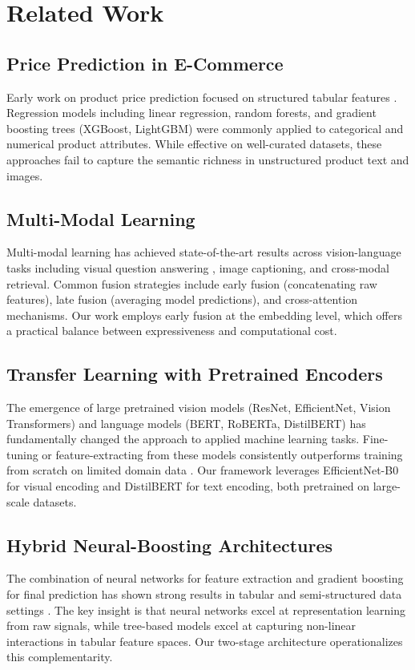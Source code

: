 \documentclass[conference]{IEEEtran}
\begin{document}
\section{Related Work}

\subsection{Price Prediction in E-Commerce}
Early work on product price prediction focused on structured tabular features \cite{ref1}. Regression models including linear regression, random forests, and gradient boosting trees (XGBoost, LightGBM) were commonly applied to categorical and numerical product attributes. While effective on well-curated datasets, these approaches fail to capture the semantic richness in unstructured product text and images.

\subsection{Multi-Modal Learning}
Multi-modal learning has achieved state-of-the-art results across vision-language tasks including visual question answering \cite{ref2}, image captioning, and cross-modal retrieval. Common fusion strategies include early fusion (concatenating raw features), late fusion (averaging model predictions), and cross-attention mechanisms. Our work employs early fusion at the embedding level, which offers a practical balance between expressiveness and computational cost.

\subsection{Transfer Learning with Pretrained Encoders}
The emergence of large pretrained vision models (ResNet, EfficientNet, Vision Transformers) and language models (BERT, RoBERTa, DistilBERT) has fundamentally changed the approach to applied machine learning tasks. Fine-tuning or feature-extracting from these models consistently outperforms training from scratch on limited domain data \cite{ref3}. Our framework leverages EfficientNet-B0 for visual encoding and DistilBERT for text encoding, both pretrained on large-scale datasets.

\subsection{Hybrid Neural-Boosting Architectures}
The combination of neural networks for feature extraction and gradient boosting for final prediction has shown strong results in tabular and semi-structured data settings \cite{ref4}. The key insight is that neural networks excel at representation learning from raw signals, while tree-based models excel at capturing non-linear interactions in tabular feature spaces. Our two-stage architecture operationalizes this complementarity.
\end{document}
